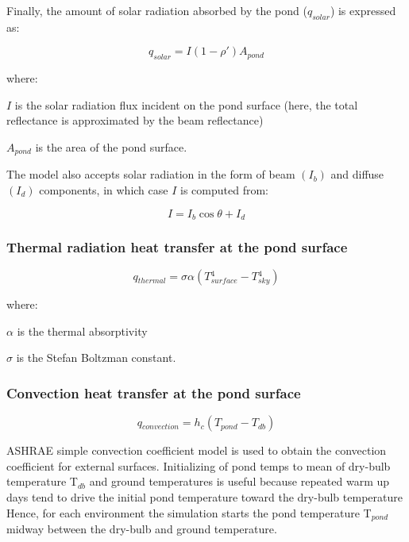 Finally, the amount of solar radiation absorbed by the pond (\({q_{solar}}\)) is expressed as:

\begin{equation}
{q_{solar}} = I\left( {1 - \rho '} \right){A_{pond}}
\end{equation}

where:

\(I\) is the solar radiation flux incident on the pond surface (here, the total reflectance is approximated by the beam reflectance)

\({A_{pond}}\) is the area of the pond surface.

The model also accepts solar radiation in the form of beam \(\left( {{I_b}} \right)\) and diffuse \(\left( {{I_d}} \right)\) components, in which case \(I\) is computed from:

\begin{equation}
I = {I_b}\cos \theta  + {I_d}
\end{equation}

\subsubsection{Thermal radiation heat transfer at the pond surface}\label{thermal-radiation-heat-transfer-at-the-pond-surface}

\begin{equation}
q{}_{thermal} = \sigma \alpha (T{{}_{surface}^4} - T{{}_{sky}^4})
\end{equation}

where:

\(\alpha\) is the thermal absorptivity

\(\sigma\) is the Stefan Boltzman constant.

\subsubsection{Convection heat transfer at the pond surface}\label{convection-heat-transfer-at-the-pond-surface}

\begin{equation}
q{}_{convection} = h{}_c(T{}_{pond} - T{}_{db})
\end{equation}

ASHRAE simple convection coefficient model is used to obtain the convection coefficient for external surfaces. Initializing of pond temps to mean of dry-bulb temperature T\(_{db}\) and ground temperatures is useful because repeated warm up days tend to drive the initial pond temperature toward the dry-bulb temperature Hence, for each environment the simulation starts the pond temperature T\(_{pond}\) midway between the dry-bulb and ground temperature.

